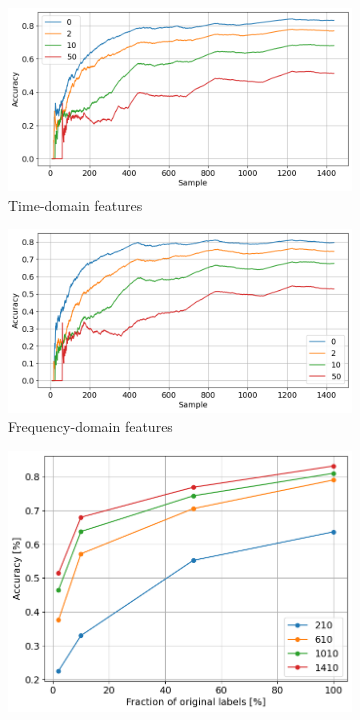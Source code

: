 \begin{figure}[h]
    \centering
    \begin{subfigure}[b]{0.48\textwidth}
        \includegraphics[width=\textwidth]{assets/results/incremental-learning/all-features-TD-skip.png}
        \caption{Time-domain features}
    \end{subfigure}
    \hfill
    \begin{subfigure}[b]{0.48\textwidth}
        \includegraphics[width=\textwidth]{assets/results/incremental-learning/all-features-FD-skip.png}
        \caption{Frequency-domain features}
    \end{subfigure}
    \hfill
    \begin{subfigure}[b]{0.48\textwidth}
        \includegraphics[width=\textwidth]{assets/results/incremental-learning/skip-labels-TD.png}

\end{subfigure}
\end{figure}
